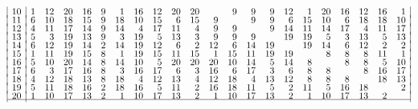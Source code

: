 {$$\begin{array}{|r|*{21}{r}|}
10 & 1 & 12 & 20 & 16 & 9 & 1 & 16 & 12 & 20 & 20 &  & 9 & 9 & 9 & 12 & 1 & 20 & 16 & 12 & 16 & 1\\[-3pt]
11 & 6 & 10 & 18 & 15 & 9 & 18 & 10 & 15 & 6 & 15 & 9 &  & 9 & 9 & 6 & 15 & 10 & 6 & 18 & 18 & 10\\[-3pt]
12 & 4 & 11 & 17 & 14 & 9 & 14 & 4 & 17 & 11 & 4 & 9 & 9 &  & 9 & 14 & 11 & 14 & 17 & 4 & 11 & 17\\[-3pt]
13 & 5 & 3 & 19 & 13 & 9 & 3 & 19 & 5 & 13 & 3 & 9 & 9 & 9 &  & 19 & 19 & 5 & 3 & 13 & 5 & 13\\[-3pt]
14 & 6 & 12 & 19 & 14 & 2 & 14 & 19 & 12 & 6 & 2 & 12 & 6 & 14 & 19 &  & 19 & 14 & 6 & 12 & 2 & 2\\[-3pt]
15 & 1 & 11 & 19 & 15 & 8 & 1 & 19 & 15 & 11 & 15 & 1 & 15 & 11 & 19 & 19 &  & 8 & 8 & 8 & 11 & 1\\[-3pt]
16 & 5 & 10 & 20 & 14 & 8 & 14 & 10 & 5 & 20 & 20 & 20 & 10 & 14 & 5 & 14 & 8 &  & 8 & 8 & 5 & 10\\[-3pt]
17 & 6 & 3 & 17 & 16 & 8 & 3 & 16 & 17 & 6 & 3 & 16 & 6 & 17 & 3 & 6 & 8 & 8 &  & 8 & 16 & 17\\[-3pt]
18 & 4 & 12 & 18 & 13 & 8 & 18 & 4 & 12 & 13 & 4 & 12 & 18 & 4 & 13 & 12 & 8 & 8 & 8 &  & 18 & 13\\[-3pt]
19 & 5 & 11 & 18 & 16 & 2 & 18 & 16 & 5 & 11 & 2 & 16 & 18 & 11 & 5 & 2 & 11 & 5 & 16 & 18 &  & 2\\[-3pt]
20 & 1 & 10 & 17 & 13 & 2 & 1 & 10 & 17 & 13 & 2 & 1 & 10 & 17 & 13 & 2 & 1 & 10 & 17 & 13 & 2 & \\[-3pt]
\hline
\end{array}
$$

}
